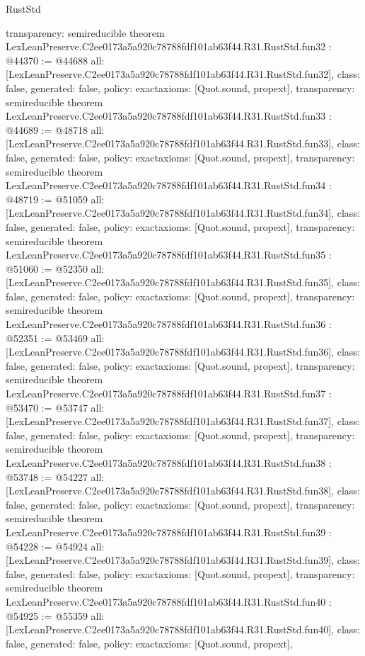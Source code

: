 \begin{lexlean}{RustStd}
\begin{coremodule}
{  transparency: semireducible
}
theorem LexLeanPreserve.C2ee0173a5a920c78788fdf101ab63f44.R31.RustStd.fun32 : @44370 := @44688 {
  all: [LexLeanPreserve.C2ee0173a5a920c78788fdf101ab63f44.R31.RustStd.fun32],
  class: false,
  generated: false,
  policy: exact{axioms: [Quot.sound, propext]},
  transparency: semireducible
}
theorem LexLeanPreserve.C2ee0173a5a920c78788fdf101ab63f44.R31.RustStd.fun33 : @44689 := @48718 {
  all: [LexLeanPreserve.C2ee0173a5a920c78788fdf101ab63f44.R31.RustStd.fun33],
  class: false,
  generated: false,
  policy: exact{axioms: [Quot.sound, propext]},
  transparency: semireducible
}
theorem LexLeanPreserve.C2ee0173a5a920c78788fdf101ab63f44.R31.RustStd.fun34 : @48719 := @51059 {
  all: [LexLeanPreserve.C2ee0173a5a920c78788fdf101ab63f44.R31.RustStd.fun34],
  class: false,
  generated: false,
  policy: exact{axioms: [Quot.sound, propext]},
  transparency: semireducible
}
theorem LexLeanPreserve.C2ee0173a5a920c78788fdf101ab63f44.R31.RustStd.fun35 : @51060 := @52350 {
  all: [LexLeanPreserve.C2ee0173a5a920c78788fdf101ab63f44.R31.RustStd.fun35],
  class: false,
  generated: false,
  policy: exact{axioms: [Quot.sound, propext]},
  transparency: semireducible
}
theorem LexLeanPreserve.C2ee0173a5a920c78788fdf101ab63f44.R31.RustStd.fun36 : @52351 := @53469 {
  all: [LexLeanPreserve.C2ee0173a5a920c78788fdf101ab63f44.R31.RustStd.fun36],
  class: false,
  generated: false,
  policy: exact{axioms: [Quot.sound, propext]},
  transparency: semireducible
}
theorem LexLeanPreserve.C2ee0173a5a920c78788fdf101ab63f44.R31.RustStd.fun37 : @53470 := @53747 {
  all: [LexLeanPreserve.C2ee0173a5a920c78788fdf101ab63f44.R31.RustStd.fun37],
  class: false,
  generated: false,
  policy: exact{axioms: [Quot.sound, propext]},
  transparency: semireducible
}
theorem LexLeanPreserve.C2ee0173a5a920c78788fdf101ab63f44.R31.RustStd.fun38 : @53748 := @54227 {
  all: [LexLeanPreserve.C2ee0173a5a920c78788fdf101ab63f44.R31.RustStd.fun38],
  class: false,
  generated: false,
  policy: exact{axioms: [Quot.sound, propext]},
  transparency: semireducible
}
theorem LexLeanPreserve.C2ee0173a5a920c78788fdf101ab63f44.R31.RustStd.fun39 : @54228 := @54924 {
  all: [LexLeanPreserve.C2ee0173a5a920c78788fdf101ab63f44.R31.RustStd.fun39],
  class: false,
  generated: false,
  policy: exact{axioms: [Quot.sound, propext]},
  transparency: semireducible
}
theorem LexLeanPreserve.C2ee0173a5a920c78788fdf101ab63f44.R31.RustStd.fun40 : @54925 := @55359 {
  all: [LexLeanPreserve.C2ee0173a5a920c78788fdf101ab63f44.R31.RustStd.fun40],
  class: false,
  generated: false,
  policy: exact{axioms: [Quot.sound, propext]},
}
\end{coremodule}
\end{lexlean}
